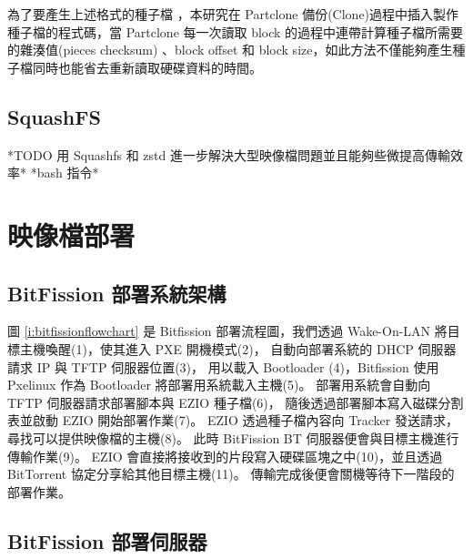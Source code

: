為了要產生上述格式的種子檔 ，本研究在 Partclone 備份(Clone)過程中插入製作種子檔的程式碼，當 Partclone 每一次讀取 block 的過程中連帶計算種子檔所需要的雜湊值(pieces checksum) 、block offset 和 block size，如此方法不僅能夠產生種子檔同時也能省去重新讀取硬碟資料的時間。


\subsection{SquashFS}
*TODO 用 Squashfs 和 zstd 進一步解決大型映像檔問題並且能夠些微提高傳輸效率*
*bash 指令*


\section{映像檔部署}
\subsection{BitFission 部署系統架構}



圖 \ref{i:bitfissionflowchart} 是 Bitfission 部署流程圖，我們透過 Wake-On-LAN 將目標主機喚醒(1)，使其進入 PXE 開機模式(2)，
自動向部署系統的 DHCP 伺服器請求 IP 與 TFTP 伺服器位置(3)，
用以載入 Bootloader (4)，Bitfission 使用 Pxelinux 作為 Bootloader 將部署用系統載入主機(5)。
部署用系統會自動向 TFTP 伺服器請求部署腳本與 EZIO 種子檔(6)，
隨後透過部署腳本寫入磁碟分割表並啟動 EZIO 開始部署作業(7)。
EZIO 透過種子檔內容向 Tracker 發送請求，尋找可以提供映像檔的主機(8)。
此時 BitFission BT 伺服器便會與目標主機進行傳輸作業(9)。
EZIO 會直接將接收到的片段寫入硬碟區塊之中(10)，並且透過 BitTorrent 協定分享給其他目標主機(11)。
傳輸完成後便會關機等待下一階段的部署作業。



\subsection{BitFission 部署伺服器}


